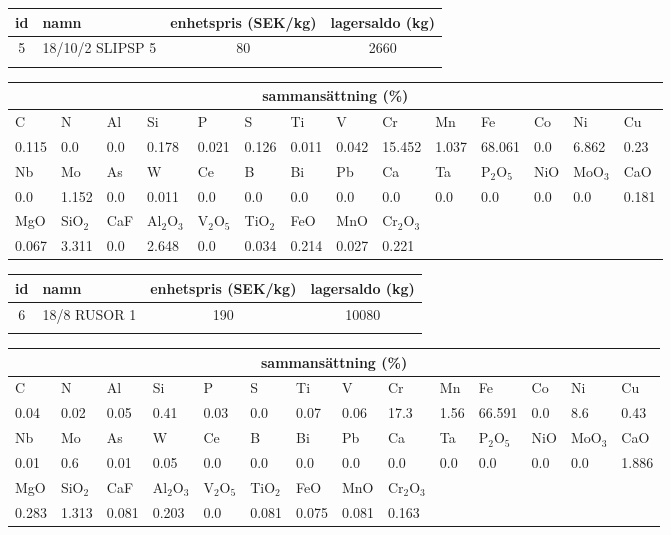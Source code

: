 \begin{center}
{\scriptsize\addtolength{\tabcolsep}{-3pt}
\begin{tabular}{clcc}
id&namn&enhetspris (SEK/kg)&lagersaldo (kg)\\
\hline
5&18/10/2 SLIPSP 5&80&2660\\\\
\end{tabular}
\begin{tabular}{llllllllllllll}
\multicolumn{14}{c}{sammansättning (\%)}\\
\hline
C&N&Al&Si&P&S&Ti&V&Cr&Mn&Fe&Co&Ni&Cu\\
\hline
0.115&0.0&0.0&0.178& 0.021&0.126&0.011&0.042& 15.452&1.037&68.061&0.0& 6.862&0.23\\
\hline
Nb&Mo&As&W&Ce&B&Bi&Pb&Ca&Ta&P$_2$O$_5$&NiO&MoO$_3$&CaO\\
\hline
0.0& 1.152& 0.0& 0.011& 0.0& 0.0& 0.0& 0.0& 0.0& 0.0& 0.0& 0.0& 0.0& 0.181\\
\hline
MgO&SiO$_2$&CaF&Al$_2$O$_3$&V$_2$O$_5$&TiO$_2$&FeO&MnO&Cr$_2$O$_3$\\
\hline
0.067& 3.311& 0.0& 2.648& 0.0& 0.034& 0.214& 0.027& 0.221\\
\end{tabular}
}
\end{center}

\begin{center}
{\scriptsize\addtolength{\tabcolsep}{-3pt}
\begin{tabular}{clcc}
id&namn&enhetspris (SEK/kg)&lagersaldo (kg)\\
\hline
6&18/8 RUSOR 1&190&10080\\\\
\end{tabular}
\begin{tabular}{llllllllllllll}
\multicolumn{14}{c}{sammansättning (\%)}\\
\hline
C&N&Al&Si&P&S&Ti&V&Cr&Mn&Fe&Co&Ni&Cu\\
\hline
0.04&0.02&0.05&0.41& 0.03&0.0&0.07&0.06& 17.3&1.56&66.591&0.0& 8.6&0.43\\
\hline
Nb&Mo&As&W&Ce&B&Bi&Pb&Ca&Ta&P$_2$O$_5$&NiO&MoO$_3$&CaO\\
\hline
0.01& 0.6& 0.01& 0.05& 0.0& 0.0& 0.0& 0.0& 0.0& 0.0& 0.0& 0.0& 0.0& 1.886\\
\hline
MgO&SiO$_2$&CaF&Al$_2$O$_3$&V$_2$O$_5$&TiO$_2$&FeO&MnO&Cr$_2$O$_3$\\
\hline
0.283& 1.313& 0.081& 0.203& 0.0& 0.081& 0.075& 0.081& 0.163\\
\end{tabular}
}
\end{center}

